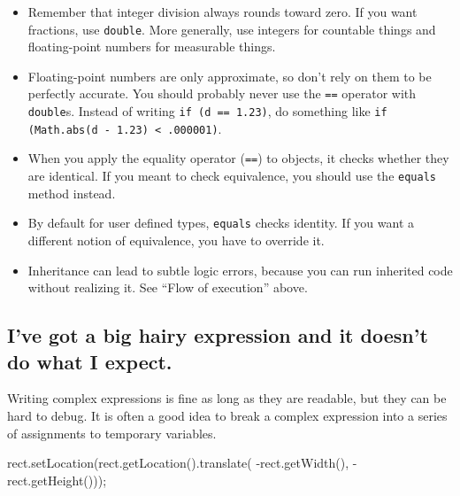 \documentclass[12pt]{book}
\theoremstyle{exercise}
\newcommand{\java}[1]{\verb"#1"}
\begin{document}
\begin{itemize}

\item Remember that integer division always rounds toward zero.
If you want fractions, use \java{double}.
More generally, use integers for countable things and floating-point numbers for measurable things.

\item Floating-point numbers are only approximate, so don't rely on them to be perfectly accurate.
You should probably never use the \java{==} operator with \java{double}s.
Instead of writing \java{if (d == 1.23)}, do something like \java{if (Math.abs(d - 1.23) < .000001)}.


\item When you apply the equality operator (\java{==}) to objects, it checks whether they are identical.
If you meant to check equivalence, you should use the \java{equals} method instead.

\item By default for user defined types, \java{equals} checks identity.
If you want a different notion of equivalence, you have to override it.

\item Inheritance can lead to subtle logic errors, because you can run inherited code without realizing it.
See ``Flow of execution'' above.

\end{itemize}


\subsection*{I've got a big hairy expression and it doesn't do what I expect.}


Writing complex expressions is fine as long as they are readable, but they can be hard to debug.
It is often a good idea to break a complex expression into a series of assignments to temporary variables.

\begin{code}
    rect.setLocation(rect.getLocation().translate(
                     -rect.getWidth(), -rect.getHeight()));
\end{code}
\end{document}
